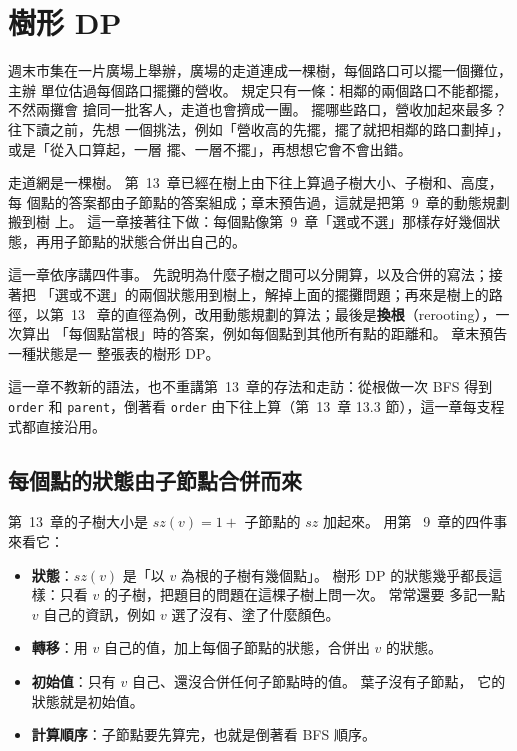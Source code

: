 \chapter{樹形 DP}
\label{ch:treedp}


週末市集在一片廣場上舉辦，廣場的走道連成一棵樹，每個路口可以擺一個攤位，主辦
單位估過每個路口擺攤的營收。 規定只有一條：相鄰的兩個路口不能都擺，不然兩攤會
搶同一批客人，走道也會擠成一團。 擺哪些路口，營收加起來最多？ 往下讀之前，先想
一個挑法，例如「營收高的先擺，擺了就把相鄰的路口劃掉」，或是「從入口算起，一層
擺、一層不擺」，再想想它會不會出錯。

走道網是一棵樹。 第~13~章已經在樹上由下往上算過子樹大小、子樹和、高度，每
個點的答案都由子節點的答案組成；章末預告過，這就是把第~9~章的動態規劃搬到樹
上。 這一章接著往下做：每個點像第~9~章「選或不選」那樣存好幾個狀
態，再用子節點的狀態合併出自己的。

這一章依序講四件事。 先說明為什麼子樹之間可以分開算，以及合併的寫法；接著把
「選或不選」的兩個狀態用到樹上，解掉上面的擺攤問題；再來是樹上的路徑，以第~13
~章的直徑為例，改用動態規劃的算法；最後是\textbf{換根}（rerooting），一次算出
「每個點當根」時的答案，例如每個點到其他所有點的距離和。 章末預告一種狀態是一
整張表的樹形 DP。

這一章不教新的語法，也不重講第~13~章的存法和走訪：從根做一次 BFS 得到
\texttt{order} 和 \texttt{parent}，倒著看 \texttt{order} 由下往上算（第~13~章
13.3 節），這一章每支程式都直接沿用。

\section{每個點的狀態由子節點合併而來}
\label{sec:tdp-merge}

第~13~章的子樹大小是 $\mathit{sz}(v) = 1 + $ 子節點的 $\mathit{sz}$ 加起來。 用第
~9~章的四件事來看它：

\begin{itemize}
\item \textbf{狀態}：$\mathit{sz}(v)$ 是「以 $v$ 為根的子樹有幾個點」。 樹形 DP
的狀態幾乎都長這樣：只看 $v$ 的子樹，把題目的問題在這棵子樹上問一次。 常常還要
多記一點 $v$ 自己的資訊，例如 $v$ 選了沒有、塗了什麼顏色。
\item \textbf{轉移}：用 $v$ 自己的值，加上每個子節點的狀態，合併出 $v$ 的狀態。
\item \textbf{初始值}：只有 $v$ 自己、還沒合併任何子節點時的值。 葉子沒有子節點，
它的狀態就是初始值。
\item \textbf{計算順序}：子節點要先算完，也就是倒著看 BFS 順序。
\end{itemize}

